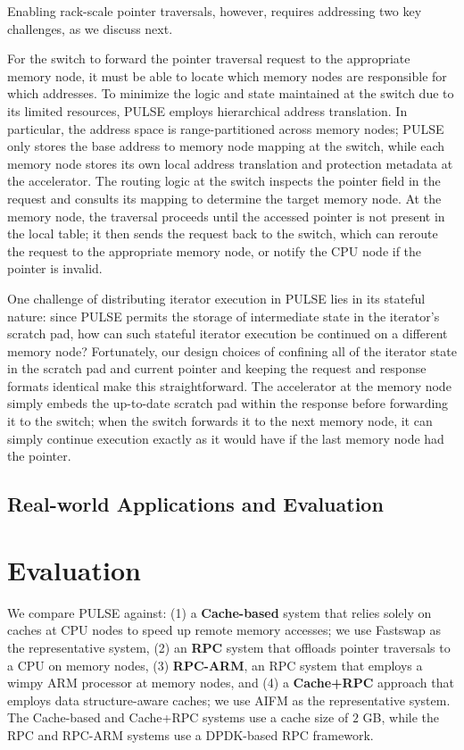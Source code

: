 Enabling rack-scale pointer traversals, however, requires addressing two key challenges, as we discuss next.

 For the switch to forward the pointer traversal request to the appropriate memory node, it must be able to locate which memory nodes are responsible for which addresses. To minimize the logic and state maintained at the switch due to its limited resources, PULSE employs hierarchical address translation. In particular, the address space is range-partitioned across memory nodes; PULSE only stores the base address to memory node mapping at the switch, while each memory node stores its own local address translation and protection metadata at the accelerator. The routing logic at the switch inspects the pointer field in the request and consults its mapping to determine the target memory node. At the memory node, the traversal proceeds until the accessed pointer is not present in the local table; it then sends the request back to the switch, which can reroute the request to the appropriate memory node, or notify the CPU node if the pointer is invalid.

 One challenge of distributing iterator execution in PULSE lies in its stateful nature: since PULSE permits the storage of intermediate state in the iterator's scratch pad, how can such stateful iterator execution be continued on a different memory node? Fortunately, our design choices of confining all of the iterator state in the scratch pad and current pointer and keeping the request and response formats identical make this straightforward. The accelerator at the memory node simply embeds the up-to-date scratch pad within the response before forwarding it to the switch; when the switch forwards it to the next memory node, it can simply continue execution exactly as it would have if the last memory node had the pointer.

\subsection{Real-world Applications and Evaluation}
\section{Evaluation}

 We compare PULSE against: (1) a \textbf{Cache-based} system that relies solely on caches at CPU nodes to speed up remote memory accesses; we use Fastswap as the representative system, (2) an \textbf{RPC} system that offloads pointer traversals to a CPU on memory nodes, (3) \textbf{RPC-ARM}, an RPC system that employs a wimpy ARM processor at memory nodes, and (4) a \textbf{Cache+RPC} approach that employs data structure-aware caches; we use AIFM as the representative system. The Cache-based and Cache+RPC systems use a cache size of $2$ GB, while the RPC and RPC-ARM systems use a DPDK-based RPC framework.


